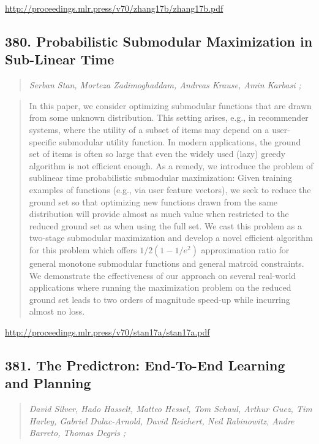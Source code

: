 \documentclass{article}
\begin{document}
\href{http://proceedings.mlr.press/v70/zhang17b/zhang17b.pdf}{http://proceedings.mlr.press/v70/zhang17b/zhang17b.pdf}

\subsection{380. Probabilistic Submodular Maximization in Sub-Linear Time}

\begin{quote}
\footnotesize{\textit{Serban Stan, Morteza Zadimoghaddam, Andreas Krause, Amin Karbasi ;}}
\end{quote}

\begin{quote}
    In this paper, we consider optimizing submodular functions that are drawn from some unknown distribution. This setting arises, e.g., in recommender systems, where the utility of a subset of items may depend on a user-specific submodular utility function. In modern applications, the ground set of items is often so large that even the widely used (lazy) greedy algorithm is not efficient enough. As a remedy, we introduce the problem of sublinear time probabilistic submodular maximization: Given training examples of functions (e.g., via user feature vectors), we seek to reduce the ground set so that optimizing new functions drawn from the same distribution will provide almost as much value when restricted to the reduced ground set as when using the full set. We cast this problem as a two-stage submodular maximization and develop a novel efficient algorithm for this problem which offers $1/2(1 - 1/e^2)$ approximation ratio for general monotone submodular functions and general matroid constraints. We demonstrate the effectiveness of our approach on several real-world applications where running the maximization problem on the reduced ground set leads to two orders of magnitude speed-up while incurring almost no loss.  \end{quote}

\href{http://proceedings.mlr.press/v70/stan17a/stan17a.pdf}{http://proceedings.mlr.press/v70/stan17a/stan17a.pdf}

\subsection{381. The Predictron: End-To-End Learning and Planning}

\begin{quote}
\footnotesize{\textit{David Silver, Hado Hasselt, Matteo Hessel, Tom Schaul, Arthur Guez, Tim Harley, Gabriel Dulac-Arnold, David Reichert, Neil Rabinowitz, Andre Barreto, Thomas Degris ;}}
\end{quote}
\end{document}
